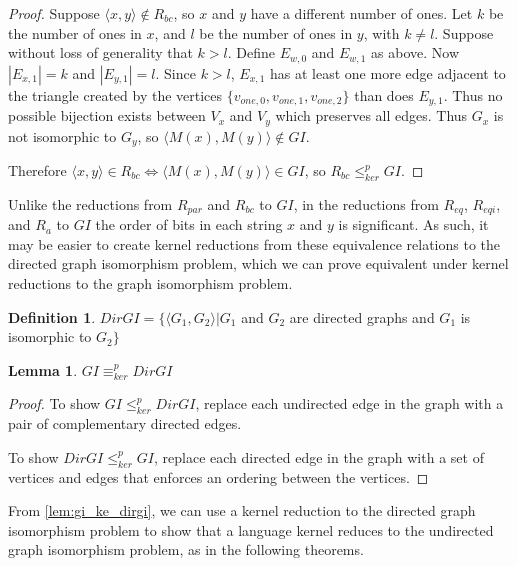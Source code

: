 \documentclass{article}
\newtheorem{lemma}[lemma]{Lemma}
\theoremstyle{definition} \newtheorem{definition}[definition]{Definition}
\newcommand{\kr}{\leq^{p}_{ker}} %
\newcommand{\kequiv}{\equiv^{p}_{ker}} %
\newcommand{\pair}[2]{\langle#1,#2\rangle} %
\begin{document}
\begin{proof}
  Suppose $\pair{x}{y}\notin R_{bc}$, so $x$ and $y$ have a different number of
  ones. Let $k$ be the number of ones in $x$, and $l$ be the number of ones in
  $y$, with $k\neq l$. Suppose without loss of generality that $k>l$. Define
  $E_{w,0}$ and $E_{w,1}$ as above. Now $|E_{x,1}|=k$ and $|E_{y,1}|=l$. Since
  $k>l$, $E_{x,1}$ has at least one more edge adjacent to the triangle created
  by the vertices $\{v_{one,0},v_{one,1},v_{one,2}\}$ than does $E_{y,1}$. Thus
  no possible bijection exists between $V_x$ and $V_y$ which preserves all
  edges. Thus $G_x$ is not isomorphic to $G_y$, so $\pair{M(x)}{M(y)}\notin
  GI$.

  Therefore $\pair{x}{y}\in R_{bc} \iff \pair{M(x)}{M(y)}\in GI$, so $R_{bc}\kr
  GI$.
\end{proof}

Unlike the reductions from $R_{par}$ and $R_{bc}$ to $GI$, in the reductions
from $R_{eq}$, $R_{eqi}$, and $R_a$ to $GI$ the order of bits in each string
$x$ and $y$ is significant. As such, it may be easier to create kernel
reductions from these equivalence relations to the directed graph isomorphism
problem, which we can prove equivalent under kernel reductions to the graph
isomorphism problem.

\begin{definition}
  $DirGI=\{\pair{G_1}{G_2}|G_1$ and $G_2$ are directed graphs and $G_1$ is
  isomorphic to $G_2\}$
\end{definition}

\begin{lemma}\label{lem:gi_ke_dirgi}$GI\kequiv DirGI$\end{lemma}
\begin{proof}
  To show $GI\kr DirGI$, replace each undirected edge in the graph with a pair
  of complementary directed edges.
  
  To show $DirGI\kr GI$, replace each directed edge in the graph with a set of
  vertices and edges that enforces an ordering between the vertices.
\end{proof}

From \autoref{lem:gi_ke_dirgi}, we can use a kernel reduction to the directed
graph isomorphism problem to show that a language kernel reduces to the
undirected graph isomorphism problem, as in the following theorems.
\end{document}

